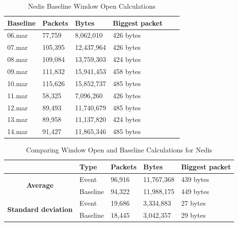 \begin{table}[H]
    \centering
    \caption{Nedis Baseline Window Open Calculations}
    \begin{tabular}{|l|l|l|l|l|l|}
    \hline
        \textbf{Baseline} & \textbf{Packets} & \textbf{Bytes} & \textbf{Biggest packet} \\ \hline
        06.mar & 77,759  & 8,062,010  & 426 bytes \\ \hline
        07.mar & 105,395 & 12,437,964 & 426 bytes \\ \hline
        08.mar & 109,084 & 13,759,303 & 424 bytes \\ \hline
        09.mar & 111,832 & 15,941,453 & 458 bytes \\ \hline
        10.mar & 115,626 & 15,852,737 & 485 bytes \\ \hline
        11.mar & 58,325  & 7,096,260  & 426 bytes \\ \hline
        12.mar & 89,493  & 11,740,679 & 485 bytes \\ \hline
        13.mar & 89,958  & 11,137,820 & 424 bytes \\ \hline
        14.mar & 91,427  & 11,865,346 & 485 bytes \\ \hline
    \end{tabular}
    \label{tab:NedisBaselineWindowCalculations}
\end{table}

\begin{table}[H]
    \centering
    \caption{Comparing Window Open and Baseline Calculations for Nedis}
    \begin{tabular}{c|l|l|l|l|}
        \cline{2-5}
        \multicolumn{1}{l|}{}                                              & \textbf{Type} & \textbf{Packets} & \textbf{Bytes} & \textbf{Biggest packet} \\ \hline
        \multicolumn{1}{|c|}{\multirow{2}{*}{\textbf{Average}}}            & Event         & 96,916             & 11,767,368      & 439 bytes               \\ \cline{2-5} 
        \multicolumn{1}{|c|}{}                                             & Baseline      & 94,322             & 11,988,175      & 449 bytes                \\ \hline
        \multicolumn{1}{|c|}{\multirow{2}{*}{\textbf{Standard deviation}}} & Event         & 19,686             & 3,334,883       & 27 bytes                 \\ \cline{2-5} 
        \multicolumn{1}{|c|}{}                                             & Baseline      & 18,445             & 3,042,357       & 29 bytes               \\ \hline          
    \end{tabular}
    \label{tab:NedisComparingBaselineAndWindowCalculations}
\end{table}

